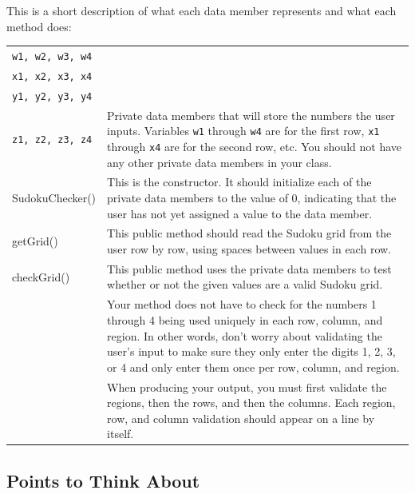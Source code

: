 \vspace*{.05in}
\noindent This is a short description of what each data member represents and what each method does:\\

\begin{tabular}{|l|p{10cm}|}
\hline
{\tt w1, w2, w3, w4} &  \\
{\tt x1, x2, x3, x4} & \\
{\tt y1, y2, y3, y4} & \\
{\tt z1, z2, z3, z4}	&  Private data members that will store the numbers the user inputs.  Variables {\tt w1} through {\tt w4}
are for the first row, {\tt x1} through {\tt x4} are for the second row, etc.  You should not have any other private data members in your class.\\
\hline
SudokuChecker()	&This is the constructor.  It should initialize each of the private data members to the value of 0, indicating
that the user has not yet assigned a value to the data member. \\
\hline

getGrid()	& This public method should read the Sudoku grid from the user row by row, using spaces between values in each row.\\
\hline 
checkGrid() &	This public method uses the private data members to test whether or not the given values are a valid Sudoku grid.\\
& Your method does not have to check for the numbers 1 through 4 being used uniquely in each row, column, and region.
In other words, don't worry about validating the user's input to make sure they only enter the digits 1, 2, 3, or 4 and only
enter them once per row, column, and region. \\ 
& When producing your output, you must first validate the regions, then the rows, and then the columns.  Each region,
row, and column validation should appear on a line by itself. \\
\hline
\end{tabular}

\vspace{-0.05in}
\subsection*{Points to Think About}
\vspace{-0.05in}

